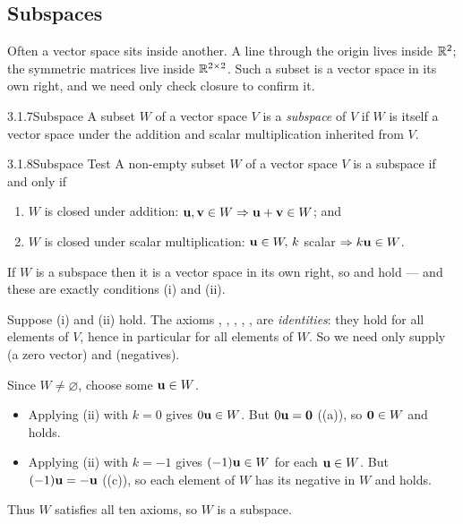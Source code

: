 \subsection{Subspaces}

Often a vector space sits inside another. A line through the origin lives inside $\mathbb{R}^2$; the symmetric matrices live inside $\mathbb{R}^{2\times2}$. Such a subset is a vector space in its own right, and we need only check closure to confirm it.

\begin{defns}{3.1.7}{Subspace}
A subset $W$ of a vector space $V$ is a \emph{subspace} of $V$ if $W$ is itself a vector space under the addition and scalar multiplication inherited from $V$.
\end{defns}

\begin{thms}{3.1.8}{Subspace Test}
A non-empty subset $W$ of a vector space $V$ is a subspace if and only if
\begin{enumerate}[label=\textup{(\roman*)},leftmargin=2.4em,itemsep=1pt]
\item $W$ is closed under addition: $\mathbf{u},\mathbf{v}\in W\Rightarrow\mathbf{u}+\mathbf{v}\in W$; and
\item $W$ is closed under scalar multiplication: $\mathbf{u}\in W,\,k$ scalar $\Rightarrow k\mathbf{u}\in W$.
\end{enumerate}
\end{thms}

\begin{prf}
\case{($\Rightarrow$)} If $W$ is a subspace then it is a vector space in its own right, so  and  hold --- and these are exactly conditions (i) and (ii).

\case{($\Leftarrow$)} Suppose (i) and (ii) hold. The axioms , , , , ,  are \emph{identities}: they hold for all elements of $V$, hence in particular for all elements of $W$. So we need only supply  (a zero vector) and  (negatives).

Since $W\neq\varnothing$, choose some $\mathbf{u}\in W$.
\begin{itemize}[leftmargin=1.4em,itemsep=2pt,topsep=2pt]
\item Applying (ii) with $k=0$ gives $0\mathbf{u}\in W$. But $0\mathbf{u}=\mathbf{0}$ ((a)), so $\mathbf{0}\in W$ and  holds.
\item Applying (ii) with $k=-1$ gives $(-1)\mathbf{u}\in W$ for each $\mathbf{u}\in W$. But $(-1)\mathbf{u}=-\mathbf{u}$ ((c)), so each element of $W$ has its negative in $W$ and  holds.
\end{itemize}
Thus $W$ satisfies all ten axioms, so $W$ is a subspace.
\end{prf}

